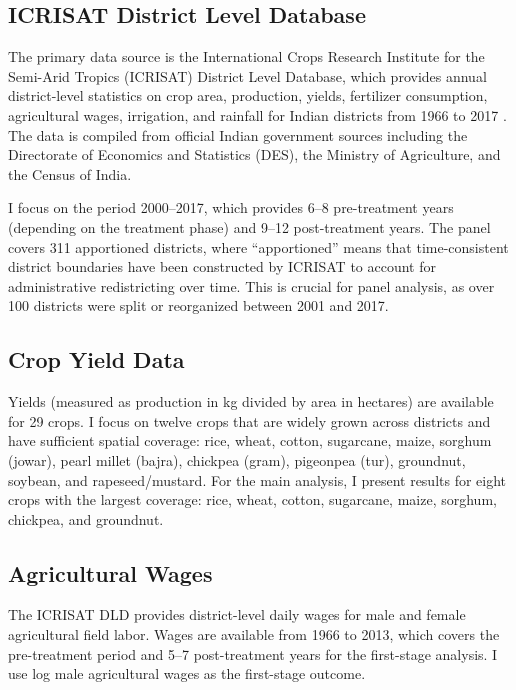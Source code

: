 \documentclass[12pt]{article}
\begin{document}
\subsection{ICRISAT District Level Database}

The primary data source is the International Crops Research Institute for the Semi-Arid Tropics (ICRISAT) District Level Database, which provides annual district-level statistics on crop area, production, yields, fertilizer consumption, agricultural wages, irrigation, and rainfall for Indian districts from 1966 to 2017 \citep{icrisat2020dld}. The data is compiled from official Indian government sources including the Directorate of Economics and Statistics (DES), the Ministry of Agriculture, and the Census of India.

I focus on the period 2000--2017, which provides 6--8 pre-treatment years (depending on the treatment phase) and 9--12 post-treatment years. The panel covers 311 apportioned districts, where ``apportioned'' means that time-consistent district boundaries have been constructed by ICRISAT to account for administrative redistricting over time. This is crucial for panel analysis, as over 100 districts were split or reorganized between 2001 and 2017.

\subsection{Crop Yield Data}

Yields (measured as production in kg divided by area in hectares) are available for 29 crops. I focus on twelve crops that are widely grown across districts and have sufficient spatial coverage: rice, wheat, cotton, sugarcane, maize, sorghum (jowar), pearl millet (bajra), chickpea (gram), pigeonpea (tur), groundnut, soybean, and rapeseed/mustard. For the main analysis, I present results for eight crops with the largest coverage: rice, wheat, cotton, sugarcane, maize, sorghum, chickpea, and groundnut.

\subsection{Agricultural Wages}

The ICRISAT DLD provides district-level daily wages for male and female agricultural field labor. Wages are available from 1966 to 2013, which covers the pre-treatment period and 5--7 post-treatment years for the first-stage analysis. I use log male agricultural wages as the first-stage outcome.
\end{document}
